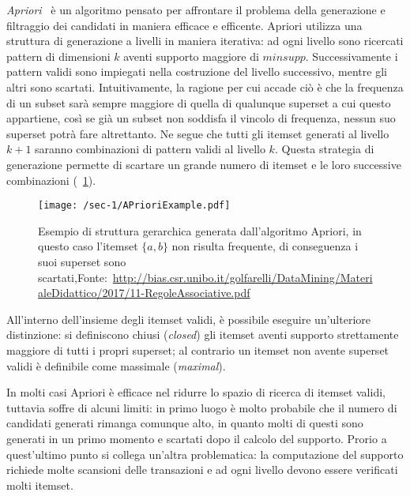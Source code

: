 \textit{Apriori}~\cite{agarwal2001tree} è un algoritmo pensato per affrontare il problema della generazione
e filtraggio dei candidati in maniera efficace e efficente.
Apriori utilizza una struttura di generazione a livelli in maniera iterativa: ad ogni livello sono ricercati pattern di dimensioni \(k\)
aventi supporto maggiore di \(minsupp\).
Successivamente i pattern validi sono impiegati nella costruzione
del livello successivo, mentre gli altri sono scartati.
Intuitivamente, la ragione per cui accade ciò è che la frequenza di un subset sarà sempre maggiore di
quella di qualunque superset a cui questo appartiene, così se già un subset non soddisfa il vincolo di frequenza,
nessun suo superset potrà fare altrettanto.
Ne segue che tutti gli itemset generati al livello \(k + 1\) saranno combinazioni di pattern validi al livello
\(k\).
Questa strategia di generazione permette di scartare un grande numero di itemset e le loro successive
combinazioni (~\cref{fig:chap-1:apriori-example}).

\begin{figure}
  \texttt{[image: /sec-1/APrioriExample.pdf]}
  \caption{Esempio di struttura gerarchica generata dall'algoritmo Apriori, in questo caso l'itemset \( \{ a,b \} \) non risulta frequente, di conseguenza i suoi superset sono scartati,Fonte:~\url{http://bias.csr.unibo.it/golfarelli/DataMining/MaterialeDidattico/2017/11-RegoleAssociative.pdf}}%
  \label{fig:chap-1:apriori-example}
\end{figure}

All'interno dell'insieme degli itemset validi, è possibile eseguire un'ulteriore distinzione:
si definiscono chiusi (\textit{closed}) gli itemset aventi supporto strettamente maggiore di
tutti i propri superset; al contrario un itemset non avente superset validi è definibile come
massimale (\textit{maximal}).

In molti casi Apriori è efficace nel ridurre lo spazio di ricerca di itemset validi, tuttavia
soffre di alcuni limiti: in primo luogo è molto probabile che il numero di candidati generati rimanga comunque
alto, in quanto molti di questi sono generati in un primo momento e scartati dopo il calcolo del supporto.
Prorio a quest'ultimo punto si collega un'altra problematica: la computazione del supporto richiede molte
scansioni delle transazioni e ad ogni livello devono essere verificati molti itemset.
